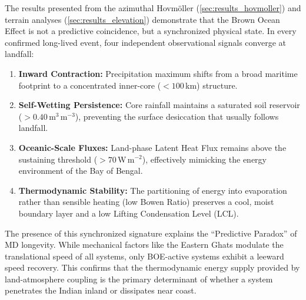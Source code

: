 The results presented from the azimuthal Hovm\"{o}ller
(\ref{sec:results_hovmoller}) and terrain analyses
(\ref{sec:results_elevation}) demonstrate that the Brown Ocean Effect
is not a predictive coincidence, but a synchronized physical state.
In every confirmed long-lived event, four independent observational
signals converge at landfall:
\begin{enumerate}
  \item \textbf{Inward Contraction:} Precipitation maximum shifts
    from a broad maritime footprint to a concentrated inner-core
    ($<100$\,km) structure.
  \item \textbf{Self-Wetting Persistence:} Core rainfall maintains a
    saturated soil reservoir ($>0.40$\,m$^3$\,m$^{-3}$), preventing the
    surface desiccation that usually follows landfall.
  \item \textbf{Oceanic-Scale Fluxes:} Land-phase Latent Heat Flux
    remains above the sustaining threshold ($>70$\,W\,m$^{-2}$),
    effectively mimicking the energy environment of the Bay of Bengal.
  \item \textbf{Thermodynamic Stability:} The partitioning of energy
    into evaporation rather than sensible heating (low Bowen Ratio)
    preserves a cool, moist boundary layer and a low Lifting
    Condensation Level (LCL).
\end{enumerate}

The presence of this synchronized signature explains the ``Predictive
Paradox'' of MD longevity. While mechanical factors like the Eastern
Ghats modulate the translational speed of all systems, only
BOE-active systems exhibit a leeward speed recovery. This confirms
that the thermodynamic energy supply provided by land-atmosphere
coupling is the primary determinant of whether a system penetrates
the Indian inland or dissipates near coast.

